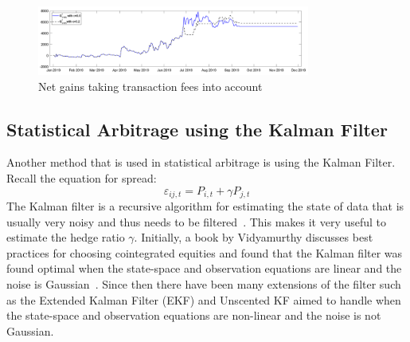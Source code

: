 \begin{figure}[htb!]
    \centering
    \includegraphics[width=0.8\textwidth]{background/Images/gains.png}
    \caption{Net gains taking transaction fees into account~\cite{Figa-TalamancaGianna2021Cdff}}
    \label{fig:gains}
\end{figure}

\subsection{Statistical Arbitrage using the Kalman Filter}
Another method that is used in statistical arbitrage is using the Kalman Filter. Recall the equation for spread:
$$\varepsilon_{i j,t} = P_{i,t} + \gamma P_{j,t}$$
\noindent The Kalman filter is a recursive algorithm for estimating the state of data that is usually very noisy and thus needs to be filtered~\cite{ALSADIK2019299}. This makes it very useful to estimate the hedge ratio $\gamma$. Initially, a book by Vidyamurthy discusses best practices for choosing cointegrated equities and found that the Kalman filter was found optimal when the state-space and observation equations are linear and the noise is Gaussian~\cite{vidyamurthy2004pairs}. Since then there have been many extensions of the filter such as the Extended Kalman Filter (EKF) and Unscented KF aimed to handle when the state-space and observation equations are non-linear and the noise is not Gaussian.
\\[5mm]
